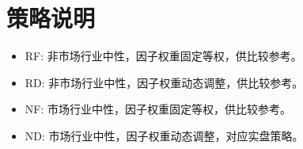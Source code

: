 \section{策略说明}

\begin{itemize}
    \item RF: 非市场行业中性，因子权重固定等权，供比较参考。
    \item RD: 非市场行业中性，因子权重动态调整，供比较参考。
    \item NF: 市场行业中性，因子权重固定等权，供比较参考。
    \item ND: 市场行业中性，因子权重动态调整，对应实盘策略。
\end{itemize}